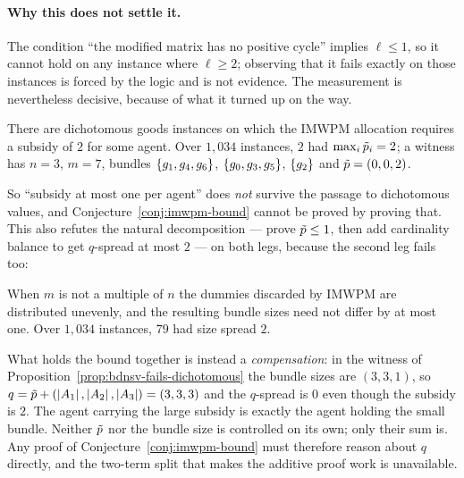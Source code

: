 \paragraph{Why this does not settle it.} The condition ``the modified matrix has
no positive cycle'' implies $\ell \le 1$, so it cannot hold on any instance
where $\ell \ge 2$; observing that it fails exactly on those instances is
forced by the logic and is not evidence. The measurement is nevertheless
decisive, because of what it turned up on the way.

\begin{proposition}
\label{prop:bdnsv-fails-dichotomous}
There are dichotomous goods instances on which the IMWPM allocation requires a
subsidy of $2$ for some agent. Over $1{,}034$ instances, $2$ had
$\max_i \tilde{p}_i = 2$; a witness has $n = 3$, $m = 7$, bundles
$\left\{g_1,g_4,g_6\right\}$, $\left\{g_0,g_3,g_5\right\}$, $\left\{g_2\right\}$ and
$\tilde{p} = (0,0,2)$.
\end{proposition}

So ``subsidy at most one per agent'' does \emph{not} survive the passage to
dichotomous values, and Conjecture~\ref{conj:imwpm-bound} cannot be proved by
proving that. This also refutes the natural decomposition --- prove
$\tilde{p} \le 1$, then add cardinality balance to get $q$-spread at most
$2$ --- on both legs, because the second leg fails too:

\begin{proposition}
\label{prop:imwpm-unbalanced}
When $m$ is not a multiple of $n$ the dummies discarded by IMWPM are distributed
unevenly, and the resulting bundle sizes need not differ by at most one. Over
$1{,}034$ instances, $79$ had size spread $2$.
\end{proposition}

What holds the bound together is instead a \emph{compensation}: in the witness of
Proposition~\ref{prop:bdnsv-fails-dichotomous} the bundle sizes are $(3,3,1)$, so
$q = \tilde{p} + (\left\lvert A_{1}\right\rvert,\left\lvert A_{2}\right\rvert,\left\lvert A_{3}\right\rvert) = (3,3,3)$ and the $q$-spread is $0$ even
though the subsidy is $2$. The agent carrying the large subsidy is exactly the
agent holding the small bundle. Neither $\tilde{p}$ nor the bundle size is
controlled on its own; only their sum is. Any proof of
Conjecture~\ref{conj:imwpm-bound} must therefore reason about $q$ directly, and
the two-term split that makes the additive proof work is unavailable.

